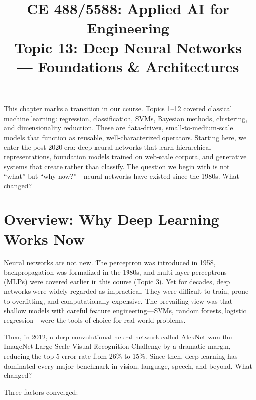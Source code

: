 \documentclass[12pt]{article}
\begin{document}
\doublespacing	

\title{CE 488/5588: Applied AI for Engineering\\ \large Topic 13: Deep Neural Networks --- Foundations \& Architectures}
\author{}
\date{}
\maketitle

\begin{ch-box}
This chapter marks a transition in our course. Topics 1--12 covered classical machine learning: regression, classification, SVMs, Bayesian methods, clustering, and dimensionality reduction. These are data-driven, small-to-medium-scale models that function as reusable, well-characterized operators. Starting here, we enter the post-2020 era: deep neural networks that learn hierarchical representations, foundation models trained on web-scale corpora, and generative systems that create rather than classify. The question we begin with is not ``what'' but ``why now?''---neural networks have existed since the 1980s. What changed?
\end{ch-box}

\section{Overview: Why Deep Learning Works Now}

Neural networks are not new. The perceptron was introduced in 1958, backpropagation was formalized in the 1980s, and multi-layer perceptrons (MLPs) were covered earlier in this course (Topic 3). Yet for decades, deep networks were widely regarded as impractical. They were difficult to train, prone to overfitting, and computationally expensive. The prevailing view was that shallow models with careful feature engineering---SVMs, random forests, logistic regression---were the tools of choice for real-world problems.

Then, in 2012, a deep convolutional neural network called AlexNet won the ImageNet Large Scale Visual Recognition Challenge by a dramatic margin, reducing the top-5 error rate from 26\% to 15\%. Since then, deep learning has dominated every major benchmark in vision, language, speech, and beyond. What changed?

Three factors converged:
\end{document}
